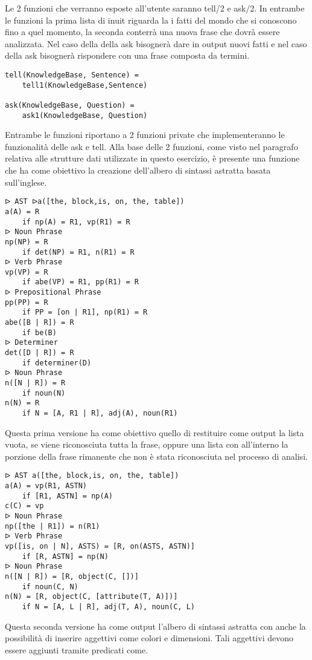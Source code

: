 \documentclass[12pt,twoside]{report}
\begin{document}
Le 2 funzioni che verranno esposte all'utente saranno tell/2 e ask/2. In entrambe le funzioni la prima lista di inuit riguarda la i fatti del mondo che si conoscono fino a quel momento, la seconda conterrà una nuova frase che dovrà essere analizzata. Nel caso della della ask bisognerà dare in output nuovi fatti e nel caso della ask bisognerà rispondere con una frase composta da termini.

\begin{lstlisting}
tell(KnowledgeBase, Sentence) = 
    tell1(KnowledgeBase,Sentence)

ask(KnowledgeBase, Question) = 
    ask1(KnowledgeBase, Question)
\end{lstlisting}

Entrambe le funzioni riportano a 2 funzioni private che implementeranno le funzionalità delle ask e tell. Alla base delle 2 funzioni, come visto nel paragrafo relativa alle strutture dati utilizzate in questo esercizio, è presente una funzione che ha come obiettivo la creazione dell'albero di sintassi astratta basata sull'inglese. 

\begin{lstlisting}
ᐅ AST ᐅa([the, block,is, on, the, table])
a(A) = R
    if np(A) = R1, vp(R1) = R
ᐅ Noun Phrase
np(NP) = R
    if det(NP) = R1, n(R1) = R
ᐅ Verb Phrase
vp(VP) = R
    if abe(VP) = R1, pp(R1) = R
ᐅ Prepositional Phrase
pp(PP) = R
    if PP = [on | R1], np(R1) = R
abe([B | R]) = R
    if be(B)
ᐅ Determiner
det([D | R]) = R
    if determiner(D)
ᐅ Noun Phrase
n([N | R]) = R
    if noun(N)
n(N) = R
    if N = [A, R1 | R], adj(A), noun(R1) 
\end{lstlisting}

Questa prima versione ha come obiettivo quello di restituire come output la lista vuota, se viene riconosciuta tutta la frase, oppure una lista con all'interno la porzione della frase rimanente che non è stata riconosciuta nel processo di analisi.

\begin{lstlisting}
ᐅ AST a([the, block,is, on, the, table])
a(A) = vp(R1, ASTN)
    if [R1, ASTN] = np(A)
c(C) = vp
ᐅ Noun Phrase
np([the | R1]) = n(R1)
ᐅ Verb Phrase
vp([is, on | N], ASTS) = [R, on(ASTS, ASTN)]
    if [R, ASTN] = np(N)
ᐅ Noun Phrase
n([N | R]) = [R, object(C, [])]
    if noun(C, N)
n(N) = [R, object(C, [attribute(T, A)])]
    if N = [A, L | R], adj(T, A), noun(C, L) 
\end{lstlisting}

Questa seconda versione ha come output l'albero di sintassi astratta con anche la possibilità di inserire aggettivi come colori e dimensioni. Tali aggettivi devono essere aggiunti tramite predicati come.
\end{document}

